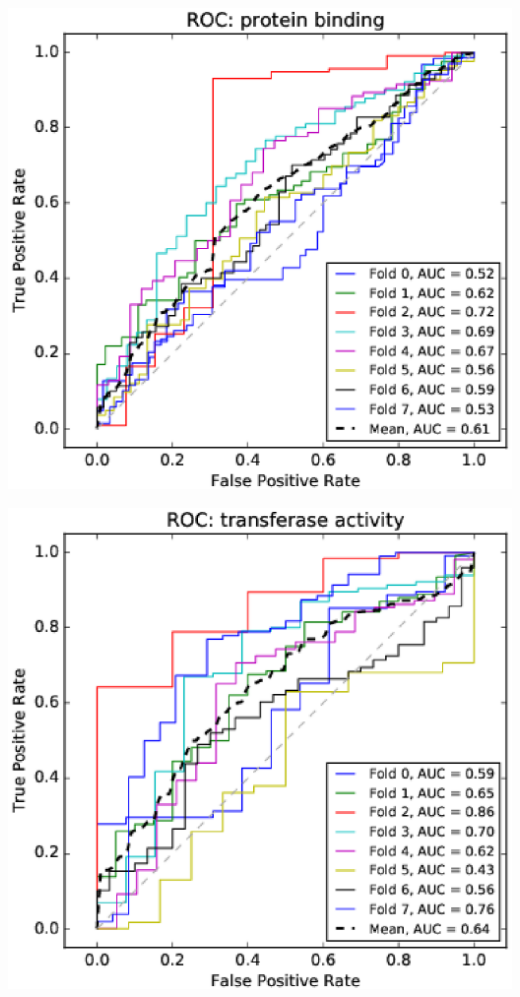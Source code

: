 \documentclass[11pt,twoside,a4paper]{book}
\newenvironment{Figure}
  {\par\medskip\noindent\minipage{\linewidth}}
  {\endminipage\par\medskip}
\begin{document}
\begin{multicols}{2}
\begin{Figure}\begin{center}\includegraphics[width=\linewidth]{figures/roc_protein_binding}\label{fig:roc_protein_binding}\end{center}\end{Figure}
\begin{Figure}\begin{center}\includegraphics[width=\linewidth]{figures/roc_transferase_activity}\label{fig:roc_transferase_activity}\end{center}\end{Figure}

\end{multicols}
\end{document}
